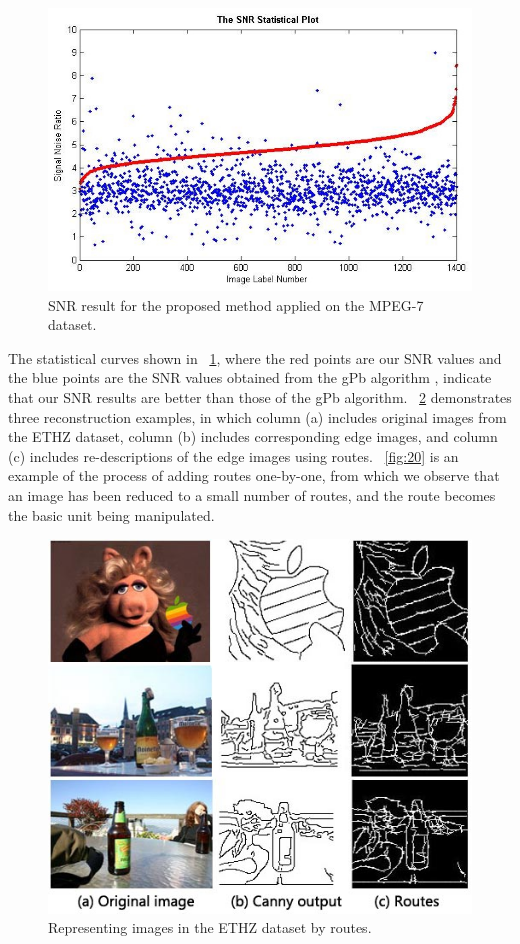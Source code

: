 \documentclass[journal]{IEEEtran}
\begin{document}
\begin{figure}[!t]
\centering
\includegraphics[width=0.7\linewidth]{images/fig18.jpg}
\caption{SNR result for the proposed method applied on the MPEG-7 dataset.}
\label{fig:18}
\end{figure}

The statistical curves shown in \figurename~\ref{fig:18}, 
where the red points are our SNR values and the blue points are the SNR values obtained from the gPb algorithm 
\cite{maire2008}, indicate that our SNR results are better than those of the gPb algorithm.
\figurename~\ref{fig:19} demonstrates three reconstruction examples,
in which column (a) includes original images from the ETHZ dataset, 
column (b) includes corresponding edge images, 
and column (c) includes re-descriptions of the edge images using routes.
\figurename~\ref{fig:20} is an example of the process of adding routes one-by-one, 
from which we observe that an image has been reduced to a small number of routes, and the route becomes the basic unit being manipulated.

\begin{figure}[!t]
\centering
\includegraphics[width=0.7\linewidth]{images/fig19.jpg}
\caption{Representing images in the ETHZ dataset by routes.}
\label{fig:19}
\end{figure}
\end{document}
